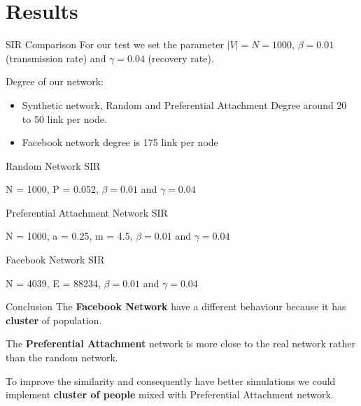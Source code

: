 \documentclass{beamer}
\begin{document}
	\section{Results}
	
	\begin{frame}{SIR Comparison}
	    For our test we set the parameter $|V|=N=1000$, $\beta = 0.01$ (transmission rate) and $\gamma= 0.04$ (recovery rate).
    
        Degree of our network:
        \begin{itemize}
            \item Synthetic network, Random and Preferential Attachment Degree around 20 to 50 link per node.
            \item Facebook network degree is 175 link per node
        \end{itemize}
	\end{frame}
	
	\begin{frame}{Random Network SIR}
	    \begin{center}
		\end{center}
		\footnotesize{
		    N = 1000,
		    P = 0.052,
		    $\beta = 0.01$ and $\gamma= 0.04$
		}
	\end{frame}
	
	\begin{frame}{Preferential Attachment Network SIR}
	    \begin{center}
		\end{center}
		\footnotesize{
		    N = 1000,
		    a = 0.25,
		    m = 4.5,
		    $\beta = 0.01$ and $\gamma= 0.04$
		}
	\end{frame}
	
	\begin{frame}{Facebook Network SIR}
	    \begin{center}
		\end{center}
		\footnotesize{
		    N = 4039,
		    E = 88234,
		    $\beta = 0.01$ and $\gamma= 0.04$
		}
	\end{frame}
	
	\begin{frame}{Conclusion}
	    The \textbf{Facebook Network} have a different behaviour because it has \textbf{cluster} of population.
	    \vspace{0.5cm}
	    
	    The \textbf{Preferential Attachment} network is more close to the real network rather than the random network.
	    \vspace{0.5cm}
	    
	    To improve the similarity and consequently have better simulations we could implement \textbf{cluster of people} mixed with Preferential Attachment network.
	    
	    
	    
	\end{frame}
	
\end{document}

